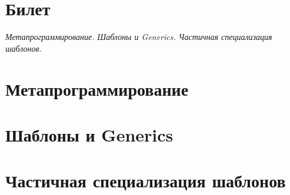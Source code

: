 \documentclass[a4paper,12pt]{article}
\begin{document}
\section*{Билет }
{\em Метапрограммирование. Шаблоны и Generics. 
Частичная специализация шаблонов.}

\section{Метапрограммирование} 
\section{Шаблоны и Generics}
\section{Частичная специализация шаблонов}
\end{document}
